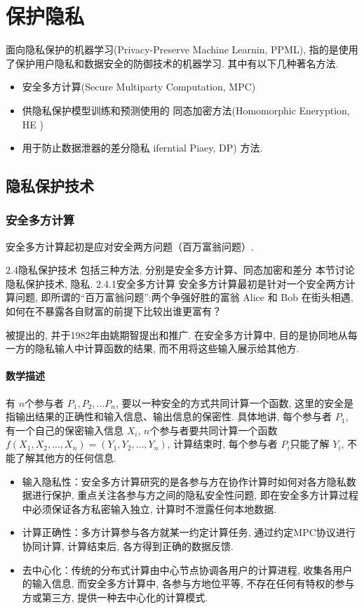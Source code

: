 \section{保护隐私}
 面向隐私保护的机器学习(Privacy-Preserve Machine Learnin, PPML), 指的是使用了保护用户隐私和数据安全的防御技术的机器学习. 其中有以下几种著名方法. \citep{ppmlmancuso}
 \begin{itemize}
     \item 
 安全多方计算(Secure Multiparty Computation,  MPC)
 \item 
 供隐私保护模型训练和预测使用的 同态加密方法(Homomorphic Eneryption,  HE )
 \item 
 用于防止数据泄器的差分隐私 iferntial Piaey, DP) 方法. 
 \end{itemize}
 
 \subsection{隐私保护技术}
 \subsubsection{安全多方计算}
 安全多方计算起初是应对安全两方问题（百万富翁问题）.  
  
2.4隐私保护技术
包括三种方法, 分别是安全多方计算、同态加密和差分
本节讨论隐私保护技术, 
隐私. 
2.4.1安全多方计算
安全多方计算最初是针对一个安全两方计算问题, 即所谓的“百万富翁问题”:两个争强好胜的富翁 Alice 和 Bob 在街头相遇, 如何在不暴露各自财富的前提下比较出谁更富有？\citep{scyao1982}

被提出的, 并于1982年由姚期智提出和推广. 在安全多方计算中, 目的是协同地从每一方的隐私输人中计算函数的结果, 而不用将这些输入展示给其他方. 
\paragraph{数学描述}
有 $n $个参与者 $P_1, P_2, ...P_n$, 要以一种安全的方式共同计算一个函数, 这里的安全是指输出结果的正确性和输入信息、输出信息的保密性. 具体地讲, 每个参与者 $P_1$, 有一个自己的保密输入信息 $X_i$, $n $个参与者要共同计算一个函数 $f(X_1, X_2, ... , X_n)=(Y_1, Y_2,  ... , Y_n)$,  计算结束时, 每个参与者 $P_i $只能了解 $Y_i$,  不能了解其他方的任何信息. 

\begin{itemize}
    \item  输入隐私性：安全多方计算研究的是各参与方在协作计算时如何对各方隐私数据进行保护, 重点关注各参与方之间的隐私安全性问题, 即在安全多方计算过程中必须保证各方私密输入独立, 计算时不泄露任何本地数据. 
\item    计算正确性：多方计算参与各方就某一约定计算任务, 通过约定MPC协议进行协同计算, 计算结束后, 各方得到正确的数据反馈. 
    \item     去中心化：传统的分布式计算由中心节点协调各用户的计算进程, 收集各用户的输入信息, 而安全多方计算中, 各参与方地位平等, 不存在任何有特权的参与方或第三方, 提供一种去中心化的计算模式. 
\end{itemize}

